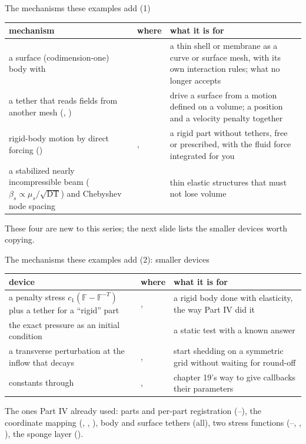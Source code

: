 \documentclass[aspectratio=169,11pt]{beamer}
\begin{document}
\begin{frame}{The mechanisms these examples add (1)}
\label{fr:mechanisms}
\footnotesize
\setlength{\tabcolsep}{3pt}
\begin{tabular}{@{}L{0.33\textwidth}L{0.14\textwidth}L{0.44\textwidth}@{}}
\toprule
mechanism & where & what it is for \\
\midrule
a surface (codimension-one) body with  &  & a thin shell or membrane as a curve or surface mesh, with its own interaction rules; what  no longer accepts \\
a tether that reads fields from another mesh (, ) &  & drive a surface from a motion defined on a volume; a position and a velocity penalty together \\
rigid-body motion by direct forcing () & ,  & a rigid part without tethers, free or prescribed, with the fluid force integrated for you \\
a stabilized nearly incompressible beam ($\beta_s \propto \mu_s/\sqrt{\mathrm{DT}}$) and Chebyshev node spacing &  & thin elastic structures that must not lose volume \\
\bottomrule
\end{tabular}

\medskip
These four are new to this series; the next slide lists the smaller devices worth copying.
\end{frame}

\begin{frame}{The mechanisms these examples add (2): smaller devices}
\label{fr:mechanisms2}
\footnotesize
\setlength{\tabcolsep}{3pt}
\begin{tabular}{@{}L{0.29\textwidth}L{0.15\textwidth}L{0.47\textwidth}@{}}
\toprule
device & where & what it is for \\
\midrule
a penalty stress $c_1(\mathbb{F} - \mathbb{F}^{-T})$ plus a tether for a ``rigid'' part & ,  & a rigid body done with elasticity, the way Part IV did it \\
the exact pressure as an initial condition &  & a static test with a known answer \\
a transverse perturbation at the inflow that decays & ,  & start shedding on a symmetric grid without waiting for round-off \\
constants through  & ,  & chapter 19's way to give callbacks their parameters \\
\bottomrule
\end{tabular}

\medskip
The ones Part IV already used: parts and per-part registration (--), the coordinate mapping (, , ), body and surface tethers (all), two stress functions (--, , ), the sponge layer ().
\end{frame}
\end{document}

